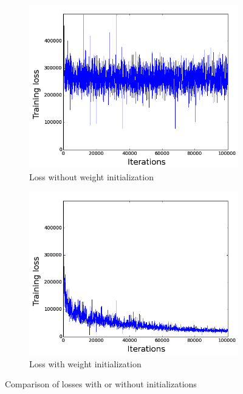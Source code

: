 \begin{figure}[ht!]
\centering
\begin{subfigure}{.5\textwidth}
  \centering
  \includegraphics[width=0.9\linewidth]{images/part2/loss_bad.png}
  \caption{Loss without weight initialization}
  \label{fig:part2:loss_bad}
\end{subfigure}%
\begin{subfigure}{.5\textwidth}
  \centering
  \includegraphics[width=0.9\linewidth]{images/part2/loss_good.png}
  \caption{Loss with weight initialization}
  \label{fig:part2:loss_good}
\end{subfigure}
\caption{Comparison of losses with or without initializations}
\label{fig:loss_comparison}
\end{figure}


